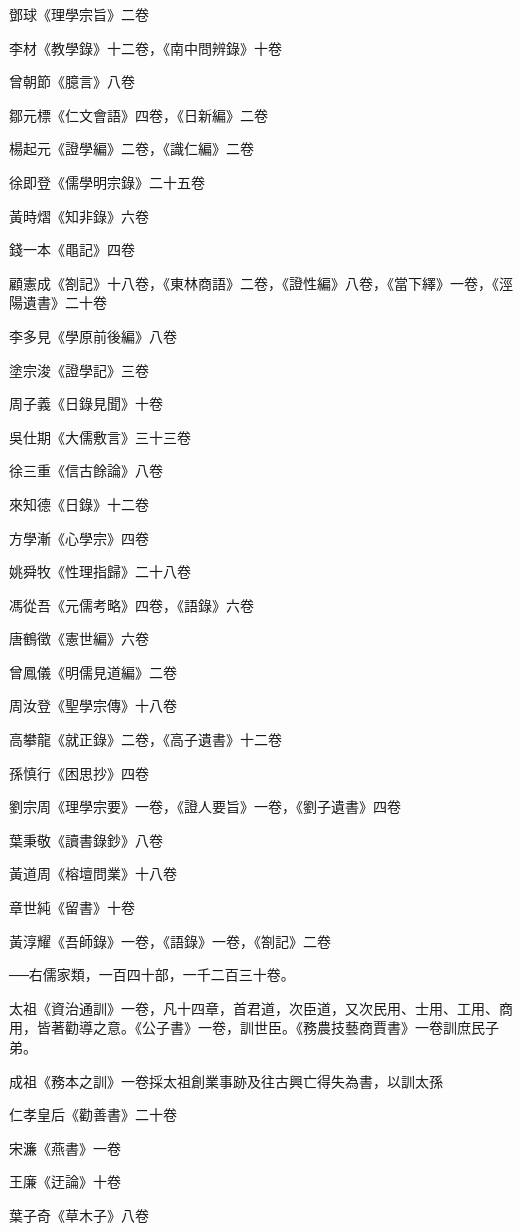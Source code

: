 鄧球《理學宗旨》二卷

李材《教學錄》十二卷，《南中問辨錄》十卷

曾朝節《臆言》八卷

鄒元標《仁文會語》四卷，《日新編》二卷

楊起元《證學編》二卷，《識仁編》二卷

徐即登《儒學明宗錄》二十五卷

黃時熠《知非錄》六卷

錢一本《黽記》四卷

顧憲成《劄記》十八卷，《東林商語》二卷，《證性編》八卷，《當下繹》一卷，《涇陽遺書》二十卷

李多見《學原前後編》八卷

塗宗浚《證學記》三卷

周子義《日錄見聞》十卷

吳仕期《大儒敷言》三十三卷

徐三重《信古餘論》八卷

來知德《日錄》十二卷

方學漸《心學宗》四卷

姚舜牧《性理指歸》二十八卷

馮從吾《元儒考略》四卷，《語錄》六卷

唐鶴徵《憲世編》六卷

曾鳳儀《明儒見道編》二卷

周汝登《聖學宗傳》十八卷

高攀龍《就正錄》二卷，《高子遺書》十二卷

孫慎行《困思抄》四卷

劉宗周《理學宗要》一卷，《證人要旨》一卷，《劉子遺書》四卷

葉秉敬《讀書錄鈔》八卷

黃道周《榕壇問業》十八卷

章世純《留書》十卷

黃淳耀《吾師錄》一卷，《語錄》一卷，《劄記》二卷

──右儒家類，一百四十部，一千二百三十卷。

太祖《資治通訓》一卷，凡十四章，首君道，次臣道，又次民用、士用、工用、商用，皆著勸導之意。《公子書》一卷，訓世臣。《務農技藝商賈書》一卷訓庶民子弟。

成祖《務本之訓》一卷採太祖創業事跡及往古興亡得失為書，以訓太孫

仁孝皇后《勸善書》二十卷

宋濂《燕書》一卷

王廉《迂論》十卷

葉子奇《草木子》八卷

